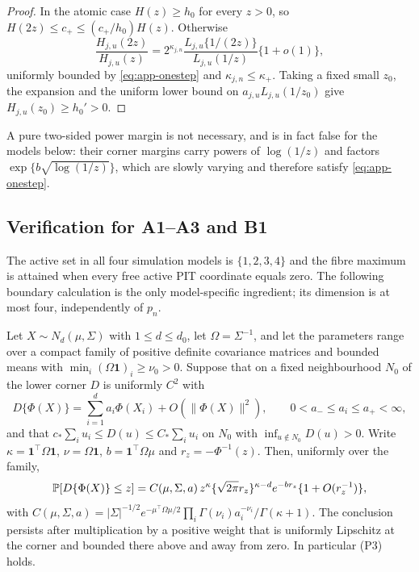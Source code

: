 \begin{proof}
In the atomic case $H(z)\ge h_0$ for every $z>0$, so
$H(2z)\le c_+\le(c_+/h_0)H(z)$. Otherwise
\[
 \frac{H_{j,u}(2z)}{H_{j,u}(z)}
 =2^{\kappa_{j,n}}\frac{L_{j,u}\{1/(2z)\}}{L_{j,u}(1/z)}\{1+o(1)\},
\]
uniformly bounded by \eqref{eq:app-onestep} and $\kappa_{j,n}\le\kappa_+$.
Taking a fixed small $z_0$, the expansion and the uniform lower bound on
$a_{j,u}L_{j,u}(1/z_0)$ give $H_{j,u}(z_0)\ge h_0'>0$.
\end{proof}

A pure two-sided power margin is not necessary, and is in fact false for
the models below: their corner margins carry powers of $\log(1/z)$ and
factors $\exp\{b\sqrt{\log(1/z)}\}$, which are slowly varying and
therefore satisfy \eqref{eq:app-onestep}.

\subsection{Verification for A1--A3 and B1}

The active set in all four simulation models is $\{1,2,3,4\}$ and the
fibre maximum is attained when every free active PIT coordinate equals
zero. The following boundary calculation is the only model-specific
ingredient; its dimension is at most four, independently of $p_n$.

\begin{lemma}\label{lem:app-corner}
Let $X\sim N_d(\mu,\Sigma)$ with $1\le d\le d_0$, let $\Omega=\Sigma^{-1}$,
and let the parameters range over a compact family of positive definite
covariance matrices and bounded means with
$\min_i(\Omega\mathbf 1)_i\ge\nu_0>0$. Suppose that on a fixed
neighbourhood $N_0$ of the lower corner $D$ is uniformly $C^2$ with
\[
 D\{\Phi(X)\}=\sum_{i=1}^da_i\Phi(X_i)+O(\|\Phi(X)\|^2),
 \qquad 0<a_-\le a_i\le a_+<\infty,
\]
and that $c_*\sum_iu_i\le D(u)\le C_*\sum_iu_i$ on $N_0$ with
$\inf_{u\notin N_0}D(u)>0$. Write $\kappa=\mathbf 1^\top\Omega\mathbf 1$,
$\nu=\Omega\mathbf 1$, $b=\mathbf 1^\top\Omega\mu$ and
$r_z=-\Phi^{-1}(z)$. Then, uniformly over the family,
\begin{equation}\label{eq:app-corner}
 \mathbb P[D\{\Phi(X)\}\le z]
 =C(\mu,\Sigma,a)\,z^{\kappa}\{\sqrt{2\pi}r_z\}^{\kappa-d}e^{-br_z}
 \{1+O(r_z^{-1})\},
\end{equation}
with
$C(\mu,\Sigma,a)=|\Sigma|^{-1/2}e^{-\mu^\top\Omega\mu/2}
\prod_i\Gamma(\nu_i)a_i^{-\nu_i}/\Gamma(\kappa+1)$.
The conclusion persists after multiplication by a positive weight that
is uniformly Lipschitz at the corner and bounded there above and away
from zero. In particular (P3) holds.
\end{lemma}

